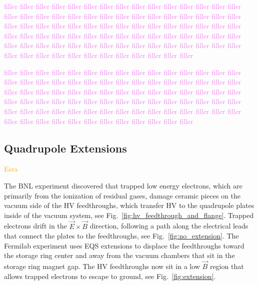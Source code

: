 \textcolor{violet}{filler filler filler filler filler filler filler filler filler filler filler filler filler filler filler filler filler filler filler filler filler filler filler filler filler filler filler filler filler filler filler filler filler filler filler filler filler filler filler filler filler filler filler filler filler filler filler filler filler filler filler filler filler filler filler filler filler filler filler filler filler filler filler filler filler filler filler filler filler filler filler filler filler filler filler filler filler filler filler filler filler filler filler filler filler filler filler}

\textcolor{violet}{filler filler filler filler filler filler filler filler filler filler filler filler filler filler filler filler filler filler filler filler filler filler filler filler filler filler filler filler filler filler filler filler filler filler filler filler filler filler filler filler filler filler filler filler filler filler filler filler filler filler filler filler filler filler filler filler filler filler filler filler filler filler filler filler filler filler filler filler filler filler filler filler filler filler filler filler filler filler filler filler filler filler filler filler filler filler filler}

\subsection{\label{sec:exten} Quadrupole Extensions}
\textcolor{orange}{Esra}
\medskip

The BNL experiment discovered that trapped low energy electrons, which are primarily from the ionization of residual gases, damage ceramic pieces on the vacuum side of the HV feedthroughs, which transfer HV to the quadrupole plates inside of the vacuum system, see Fig.~\ref{fig:hv_feedthrough_and_flange}. Trapped electrons drift in the $\vec{E}\times\vec{B}$ direction, following a path along the electrical leads that connect the plates to the feedthroughs, see Fig.~\ref{fig:no_extension}. The Fermilab experiment uses EQS extensions to displace the feedthroughs toward the storage ring center and away from the vacuum chambers that sit in the storage ring magnet gap. The HV feedthroughs now sit in a low $\vec{B}$ region that allows trapped electrons to escape to ground, see Fig.~\ref{fig:extension}.

